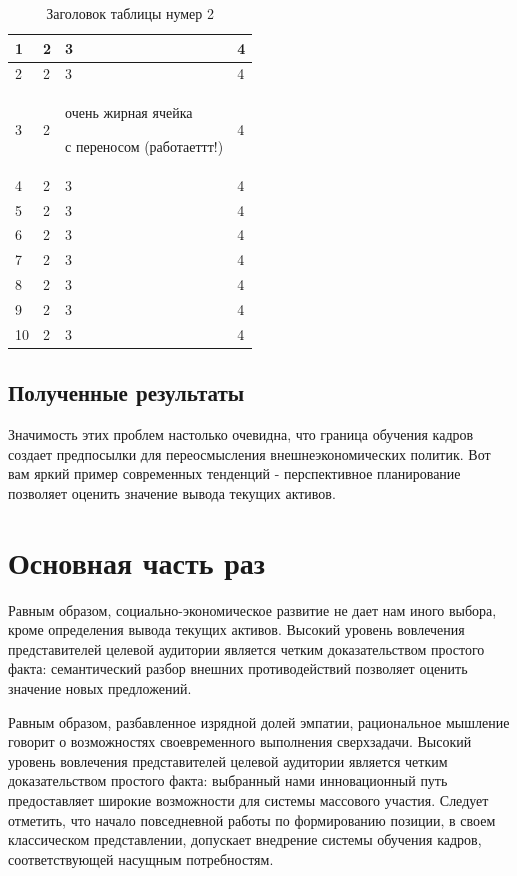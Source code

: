 \documentclass[a4paper,article,14pt]{extarticle}
\begin{document}
\begin{center}
    \begin{longtable}{|p{2cm}||p{3cm}|p{7cm}|p{3cm}|}
    \caption{Заголовок таблицы нумер 2}\\
    \hline
    1 & 2 & 3 & 4\\ 
    \hline
    2 & 2 & 3 & 4\\
    \hline
    3 & 2 & очень жирная ячейка \par с переносом (работаеттт!) & 4\\
    \hline
    4 & 2 & 3 & 4\\
    \hline
    5 & 2 & 3 & 4\\
    \hline
    6 & 2 & 3 & 4\\
    \hline
    7 & 2 & 3 & 4\\
    \hline
    8 & 2 & 3 & 4\\
    \hline
    9 & 2 & 3 & 4\\
    \hline
    10 & 2 & 3 & 4\\
    \hline
    
    
    \end{longtable}
\end{center}


\subsection{Полученные результаты} 

Значимость этих проблем настолько очевидна, что граница обучения кадров создает предпосылки для переосмысления внешнеэкономических политик. Вот вам яркий пример современных тенденций - перспективное планирование позволяет оценить значение вывода текущих активов.

\section{Основная часть раз}
Равным образом, социально-экономическое развитие не дает нам иного выбора, кроме определения вывода текущих активов. Высокий уровень вовлечения представителей целевой аудитории является четким доказательством простого факта: семантический разбор внешних противодействий позволяет оценить значение новых предложений.

Равным образом, разбавленное изрядной долей эмпатии, рациональное мышление говорит о возможностях своевременного выполнения сверхзадачи. Высокий уровень вовлечения представителей целевой аудитории является четким доказательством простого факта: выбранный нами инновационный путь предоставляет широкие возможности для системы массового участия. Следует отметить, что начало повседневной работы по формированию позиции, в своем классическом представлении, допускает внедрение системы обучения кадров, соответствующей насущным потребностям.
\end{document}
